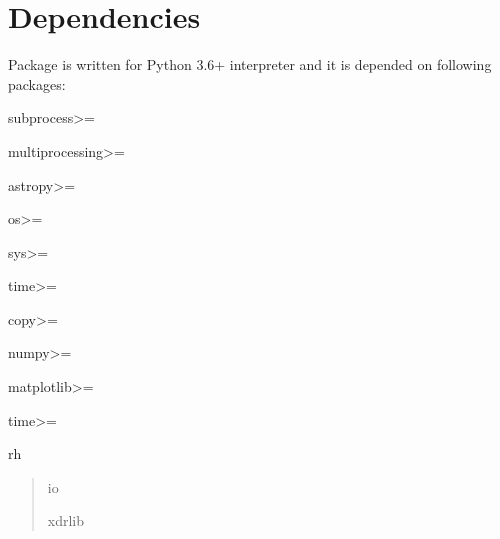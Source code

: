 \documentclass[letterpaper,10pt,english]{sphinxmanual}
\begin{document}
\section{Dependencies}
\label{\detokenize{user/installation:dependencies}}
Package is written for Python 3.6+ interpreter and it is depended on following packages:

subprocess\textgreater{}=

multiprocessing\textgreater{}=

astropy\textgreater{}=

os\textgreater{}=

sys\textgreater{}=

time\textgreater{}=

copy\textgreater{}=

numpy\textgreater{}=

matplotlib\textgreater{}=

time\textgreater{}=

rh
\begin{quote}

io

xdrlib
\end{quote}



\renewcommand{\indexname}{Index}
\printindex
\end{document}
